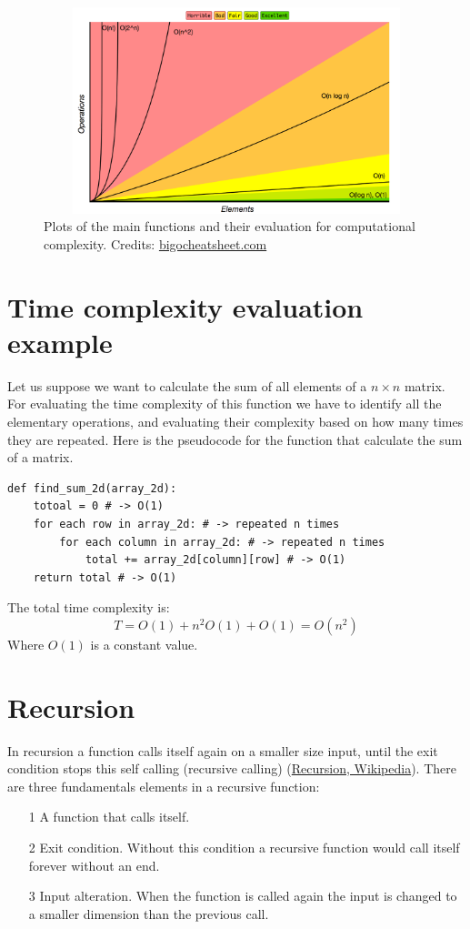 \begin{figure}[hb]
	\includegraphics[width=14cm,height=6cm]{chapters/introduction/images/big_o_plots.png}
	\caption[]{Plots of the main functions and their evaluation for computational complexity. Credits: \href{https://www.bigocheatsheet.com/}{bigocheatsheet.com}}
\end{figure}

\section{Time complexity evaluation example}
Let us suppose we want to calculate the sum of all elements of a \(n\times n\) matrix. For evaluating the time complexity of this function we have to identify all the elementary operations, and evaluating their complexity based on how many times they are repeated. Here is the pseudocode for the function that calculate the sum of a matrix.

\begin{lstlisting}[caption={Sum of all elements of a matrix.}]
def find_sum_2d(array_2d):
	totoal = 0 # -> O(1)
	for each row in array_2d: # -> repeated n times
		for each column in array_2d: # -> repeated n times
			total += array_2d[column][row] # -> O(1)
	return total # -> O(1)
\end{lstlisting}

The total time complexity is: 
\[T = O(1) + n^{2}O(1) + O(1) = O(n^{2}) \]
Where \(O(1)\) is a constant value.

\section{Recursion}
In recursion a function calls itself again on a smaller size input, until the exit condition stops this self calling (recursive calling) \cite{wikirecursion} (\href{https://en.wikipedia.org/wiki/Recursion_(computer_science)}{Recursion, Wikipedia}). There are three fundamentals elements in a recursive function:
\begin{itemize}
\item[1] A function that calls itself.
\item[2] Exit condition. Without this condition a recursive function would call itself forever without an end.
\item[3] Input alteration. When the function is called again the input is changed to a smaller dimension than the previous call.
\end{itemize}

